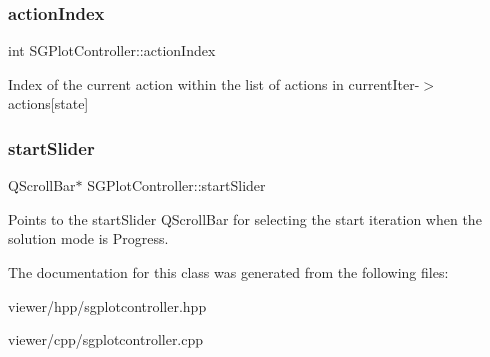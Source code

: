 \subsubsection{\texorpdfstring{action\+Index}{actionIndex}}
{\footnotesize\ttfamily int S\+G\+Plot\+Controller\+::action\+Index\hspace{0.3cm}{\ttfamily [private]}}

Index of the current action within the list of actions in current\+Iter-\/$>$actions\mbox{[}state\mbox{]} \mbox{\label{classSGPlotController_a399d56ae9da6dac78110e9b70e842ffe}} 
\subsubsection{\texorpdfstring{start\+Slider}{startSlider}}
{\footnotesize\ttfamily Q\+Scroll\+Bar$\ast$ S\+G\+Plot\+Controller\+::start\+Slider\hspace{0.3cm}{\ttfamily [private]}}

Points to the start\+Slider Q\+Scroll\+Bar for selecting the start iteration when the solution mode is Progress. 

The documentation for this class was generated from the following files\+:\begin{DoxyCompactItemize}
\item 
viewer/hpp/sgplotcontroller.\+hpp\item 
viewer/cpp/sgplotcontroller.\+cpp\end{DoxyCompactItemize}
